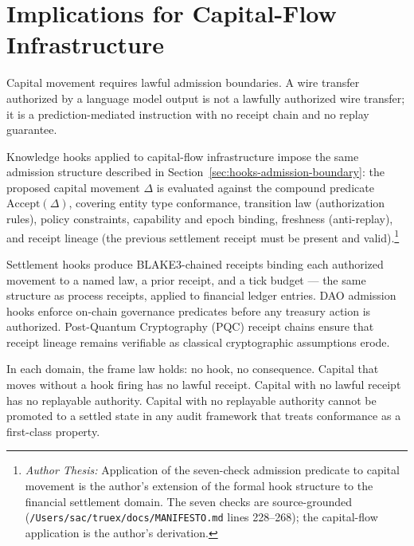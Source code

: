 \section{Implications for Capital-Flow Infrastructure}
\label{sec:hooks-capital-flow}

Capital movement requires lawful admission boundaries. A wire transfer authorized by a
language model output is not a lawfully authorized wire transfer; it is a prediction-mediated
instruction with no receipt chain and no replay guarantee.

Knowledge hooks applied to capital-flow infrastructure impose the same admission structure
described in Section~\ref{sec:hooks-admission-boundary}: the proposed capital movement $\Delta$
is evaluated against the compound predicate $\text{Accept}(\Delta)$, covering entity type
conformance, transition law (authorization rules), policy constraints, capability and epoch
binding, freshness (anti-replay), and receipt lineage (the previous settlement receipt
must be present and valid).\footnote{\textit{Author Thesis:} Application of the seven-check
admission predicate to capital movement is the author's extension of the formal hook
structure to the financial settlement domain. The seven checks are source-grounded
(\texttt{/Users/sac/truex/docs/MANIFESTO.md} lines 228--268); the capital-flow application
is the author's derivation.}

Settlement hooks produce BLAKE3-chained receipts binding each authorized movement to a named
law, a prior receipt, and a tick budget --- the same structure as process receipts, applied
to financial ledger entries. DAO admission hooks enforce on-chain governance predicates before
any treasury action is authorized. Post-Quantum Cryptography (PQC) receipt chains ensure that
receipt lineage remains verifiable as classical cryptographic assumptions erode.

In each domain, the frame law holds: no hook, no consequence. Capital that moves without a
hook firing has no lawful receipt. Capital with no lawful receipt has no replayable authority.
Capital with no replayable authority cannot be promoted to a settled state in any audit
framework that treats conformance as a first-class property.
